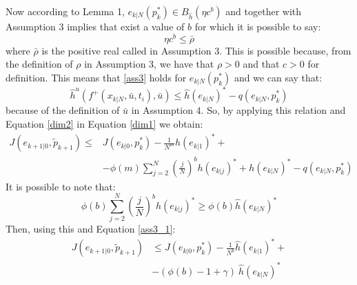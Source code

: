 Now according to Lemma 1, $e_{k|N}(p_k^*) \in B_{\hat{h}}(\eta c^b)$ and together with Assumption 3 implies that exist a value of $b$ for which it is possible to say:
\begin{equation}
\eta c^b \leq \bar{\rho}
\end{equation}
where $\bar{\rho}$ is the positive real called in Assumption 3. This is possible because, from the definition of $\rho$ in Assumption 3, we have that $\rho > 0$ and that $c>0$ for definition.
This means that \ref{ass3} holds for $e_{k|N}(p_k^*)$ and we can say that:
\begin{equation}\label{dim2}
    \hat{h}^u\left(f^+(x_{k|N},\bar{u},t_i),\bar{u}\right) \le \hat{h}(e_{k|N})^*-q(e_{k|N},p_k^*)
\end{equation}
because of the definition of $\bar{u}$ in Assumption 4. So, by applying this relation and Equation \ref{dim2} in Equation \ref{dim1} we obtain: 
\begin{equation*}
    \begin{split}
        J({e}_{k+1|0},\tilde{p}_{k+1})\le &J({e}_{k|0},p_{k}^*) - \frac{1}{N^m}h(e_{k|1})^*+ \\ 
        &-\phi(m)\sum_{j=2}^{N}\left(\frac{j}{N}\right)^b h(e_{k|j})^*+ h(e_{k|N})^*-q(e_{k|N},p_k^*)
    \end{split}
\end{equation*}
It is possible to note that: 
\begin{equation}
\phi(b)\sum_{j=2}^{N}\left(\frac{j}{N}\right)^b h(e_{k|j})^* \ge \phi(b)\hat{h}(e_{k|N})^*
\end{equation}
Then, using this and Equation \ref{ass3_1}:
\begin{equation*}
    \begin{split}
        J({e}_{k+1|0},\tilde{p}_{k+1})&\le J({e}_{k|0},p_{k}^*) - \frac{1}{N^b}\hat{h}(e_{k|1})^*+ \\ 
            &-(\phi(b)-1+\gamma)\ \hat{h}(e_{k|N})^*
    \end{split}
\end{equation*}


